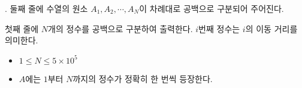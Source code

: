 \begin{problem}{\probno{}. \probtitle{}}
둘째 줄에 수열의 원소 $A_1, A_2, \cdots, A_N$이 차례대로 공백으로 구분되어 주어진다.

\OutputFile

첫째 줄에 $N$개의 정수를 공백으로 구분하여 출력한다. $i$번째 정수는 $i$의 이동 거리를 의미한다.

\Constraints

\begin{itemize}[noitemsep]
    \item $1 \leq N \leq 5 \times 10^5$
    \item $A$에는 $1$부터 $N$까지의 정수가 정확히 한 번씩 등장한다.
\end{itemize}

\Example

\begin{example}
\end{example}




\end{problem}